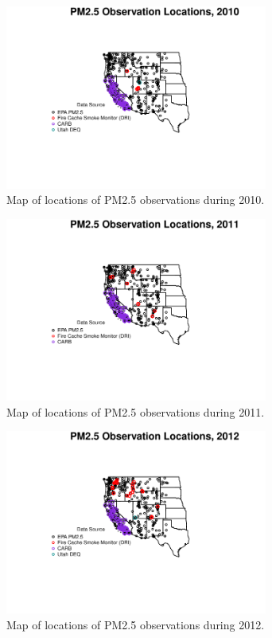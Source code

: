 \begin{figure} 
\centering 
\includegraphics[width=0.77\textwidth]{Code_Outputs/MonitorLocationsByYear/MapPM25_All_Sitesplot_year2010.pdf} 
\caption{\label{fig:MapPM25Loc2010}Map of locations of PM2.5 observations during 2010.} 
\end{figure} 
 

\begin{figure} 
\centering 
\includegraphics[width=0.77\textwidth]{Code_Outputs/MonitorLocationsByYear/MapPM25_All_Sitesplot_year2011.pdf} 
\caption{\label{fig:MapPM25Loc2011}Map of locations of PM2.5 observations during 2011.} 
\end{figure} 
 

\begin{figure} 
\centering 
\includegraphics[width=0.77\textwidth]{Code_Outputs/MonitorLocationsByYear/MapPM25_All_Sitesplot_year2012.pdf} 
\caption{\label{fig:MapPM25Loc2012}Map of locations of PM2.5 observations during 2012.} 
\end{figure} 
 

